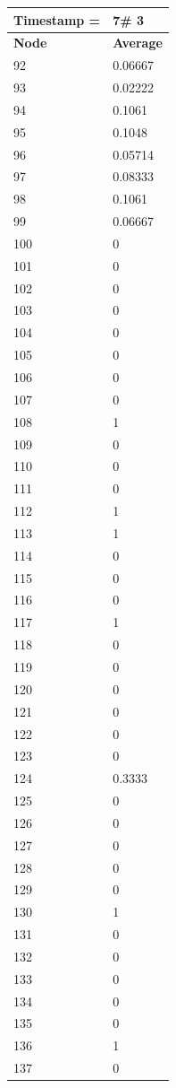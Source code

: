 \begin{tabular}{|l||l|}
\hline
\textbf{Timestamp =} & \textbf{7}\# 3\\\hline
	\textbf{Node} & \textbf{Average} \\ \hline
\hline
	92 & 0.06667 \\ \hline
	93 & 0.02222 \\ \hline
	94 & 0.1061 \\ \hline
	95 & 0.1048 \\ \hline
	96 & 0.05714 \\ \hline
	97 & 0.08333 \\ \hline
	98 & 0.1061 \\ \hline
	99 & 0.06667 \\ \hline
	100 & 0 \\ \hline
	101 & 0 \\ \hline
	102 & 0 \\ \hline
	103 & 0 \\ \hline
	104 & 0 \\ \hline
	105 & 0 \\ \hline
	106 & 0 \\ \hline
	107 & 0 \\ \hline
	108 & 1 \\ \hline
	109 & 0 \\ \hline
	110 & 0 \\ \hline
	111 & 0 \\ \hline
	112 & 1 \\ \hline
	113 & 1 \\ \hline
	114 & 0 \\ \hline
	115 & 0 \\ \hline
	116 & 0 \\ \hline
	117 & 1 \\ \hline
	118 & 0 \\ \hline
	119 & 0 \\ \hline
	120 & 0 \\ \hline
	121 & 0 \\ \hline
	122 & 0 \\ \hline
	123 & 0 \\ \hline
	124 & 0.3333 \\ \hline
	125 & 0 \\ \hline
	126 & 0 \\ \hline
	127 & 0 \\ \hline
	128 & 0 \\ \hline
	129 & 0 \\ \hline
	130 & 1 \\ \hline
	131 & 0 \\ \hline
	132 & 0 \\ \hline
	133 & 0 \\ \hline
	134 & 0 \\ \hline
	135 & 0 \\ \hline
	136 & 1 \\ \hline
	137 & 0 \\ \hline
\end{tabular}


